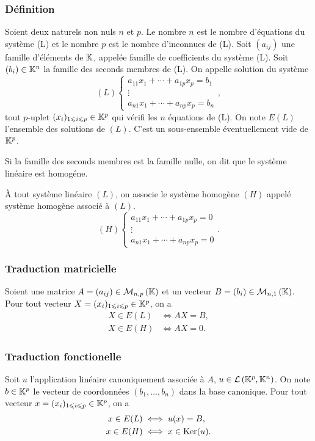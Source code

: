 \subsubsection{Définition}
\begin{defdef}
  Soient deux naturels non nuls \(n\) et \(p\). Le nombre \(n\) est le nombre d'équations du système (L) et le nombre \(p\) est le nombre d'inconnues de (L). Soit \((a_{ij})\) une famille d'éléments de \(\mathbb{K}\), appelée famille de coefficients du système (L). Soit \((b_i) \in \mathbb{K}^n\) la famille des seconds membres de (L). On appelle solution du système
  \begin{equation}
    (L)
    \begin{cases}
      a_{11}x_1 + \dotsb +a_{1p}x_p = b_1 \\
      \vdots \\
      a_{n1}x_1 + \dotsb +a_{np}x_p = b_n
    \end{cases},
  \end{equation}
  tout \(p\)-uplet \((x_i)_{1\leqslant i\leqslant p} \in \mathbb{K}^p\) qui vérifi les \(n\) équations de (L). On note \(E(L)\) l'ensemble des solutions de \((L)\). C'est un sous-ensemble éventuellement vide de \(\mathbb{K}^p\).
\end{defdef}
%
\begin{defdef}
  Si la famille des seconds membres est la famille nulle, on dit que le système linéaire est homogéne.
\end{defdef}
%
À tout système linéaire \((L)\), on associe le système homogène \((H)\) appelé système homogène associé à \((L)\).
\begin{equation}
  (H)
  \begin{cases}
    a_{11}x_1 + \dotsb +a_{1p}x_p = 0 \\
    \vdots \\
    a_{n1}x_1 + \dotsb +a_{np}x_p = 0
  \end{cases}.
\end{equation}
%
\subsubsection{Traduction matricielle}
Soient une matrice \(A = (a_{ij}) \in \mathcal{M}_{n,p}\left(\mathbb{K}\right)\) et un vecteur \(B = (b_{i}) \in \mathcal{M}_{n,1}\left(\mathbb{K}\right)\). Pour tout vecteur \(X = (x_i)_{1\leqslant i \leqslant p} \in \mathbb{K}^p\), on a
\begin{align}
  X \in E(L) &\iff AX = B, \\
  X \in E(H) &\iff AX = 0.
\end{align}
%
\subsubsection{Traduction fonctionelle}
Soit \(u\) l'application linéaire canoniquement associée à \(A\), \(u \in \mathcal{L}\left(\mathbb{K}^p,\mathbb{K}^n\right)\). On note \(b \in \mathbb{K}^p\) le vecteur de coordonnées \((b_1, \ldots, b_n)\) dans la base canonique. Pour tout vecteur \(x = (x_i)_{1\leqslant i \leqslant p} \in \mathbb{K}^p\), on a
\begin{align}
  x \in E(L) &\iff u(x) = B, \\
  x \in E(H) &\iff x\in\operatorname{Ker}(u).
\end{align}

